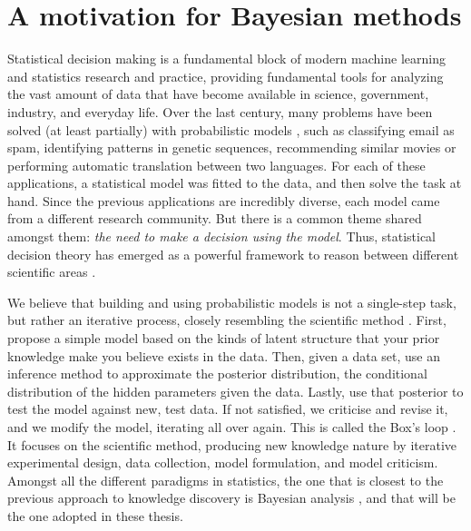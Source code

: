 
\section{A motivation for Bayesian methods}

Statistical decision making \parencite{french2000statistical} is a fundamental block of modern machine learning and statistics research and practice,
providing fundamental tools for analyzing the vast amount of data that have become available in science, government, industry, and everyday life. Over the last century, many problems have been solved (at least partially) with probabilistic models \parencite{bishop2006pattern}, such as classifying email as spam, identifying patterns in genetic sequences, recommending similar movies or performing automatic translation between two languages. For each of these applications, a statistical model was fitted to the data, and then solve the task at hand. Since the previous applications are incredibly diverse, each model came from a different research community. But there is a common theme shared amongst them: \emph{the need to make a decision using the model}. Thus, statistical decision theory has emerged as a powerful framework to reason between different scientific areas \parencite{french2000statistical}.

We believe that building and using probabilistic models is not a single-step task, but rather an iterative process, closely resembling the scientific method \parencite{conant1959understanding}. First, propose a simple model based on the kinds of latent structure that your prior knowledge make you believe exists in the data. Then, given a data set, use an inference
method to approximate the posterior distribution, the conditional distribution of the hidden parameters
given the data. Lastly,
use that posterior to test the model against new, test data. If not satisfied, we criticise and revise it, and we modify the model, iterating all over again. This is called the Box's loop \parencite{doi:10.1080/00401706.1962.10490015,10.2307/1266125}. It focuses on the scientific method, producing new knowledge nature by iterative experimental design, data collection,
model formulation, and model criticism.
Amongst all the different paradigms in statistics, the one that is closest to the previous approach to knowledge discovery is Bayesian analysis \parencite{gelman2013bayesian,insua2012bayesian}, and that will be the one adopted in these thesis.


